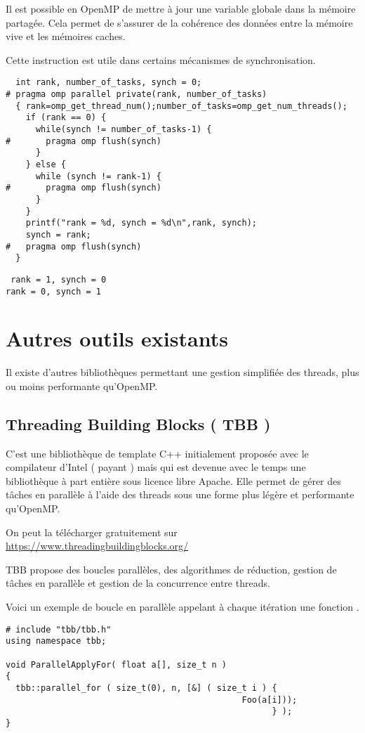 \documentclass[fleqn,11pt]{article}
\begin{document}
Il est possible en OpenMP de mettre à jour une variable globale dans la mémoire
partagée. Cela permet de s'assurer de la cohérence des données entre la mémoire
vive et les mémoires caches.

Cette instruction est utile dans certains mécanismes de synchronisation.

\begin{lstlisting}
  int rank, number_of_tasks, synch = 0;
# pragma omp parallel private(rank, number_of_tasks)
  { rank=omp_get_thread_num();number_of_tasks=omp_get_num_threads();
    if (rank == 0) {
      while(synch != number_of_tasks-1) {
#       pragma omp flush(synch)
      }
    } else {
      while (synch != rank-1) {
#       pragma omp flush(synch)
      }
    }
    printf("rank = %d, synch = %d\n",rank, synch);
    synch = rank;
#   pragma omp flush(synch)
  }
\end{lstlisting}
\texttt{
rank = 1, synch = 0\\
rank = 0, synch = 1
}
  
\section{Autres outils existants}

Il existe d'autres bibliothèques permettant une gestion simplifiée des threads, plus ou moins
performante qu'OpenMP.

\subsection{Threading Building Blocks ( TBB )}

C'est une bibliothèque de template C++ initialement proposée avec le compilateur d'Intel
( payant ) mais qui est devenue avec le temps une bibliothèque à part entière sous
licence libre Apache. Elle permet de gérer des tâches en parallèle à l'aide des threads
sous une forme plus légère et performante qu'OpenMP.

On peut la télécharger gratuitement sur \url{https://www.threadingbuildingblocks.org/}

TBB propose des boucles parallèles, des algorithmes de réduction, gestion de tâches
en parallèle et gestion de la concurrence entre threads.

Voici un exemple de boucle en parallèle appelant à chaque itération une fonction \verb@Foo@.
\begin{lstlisting}
# include "tbb/tbb.h"
using namespace tbb;

void ParallelApplyFor( float a[], size_t n )
{
  tbb::parallel_for ( size_t(0), n, [&] ( size_t i ) {
                                               Foo(a[i]));
                                                     } );
}
\end{lstlisting}
\end{document}
